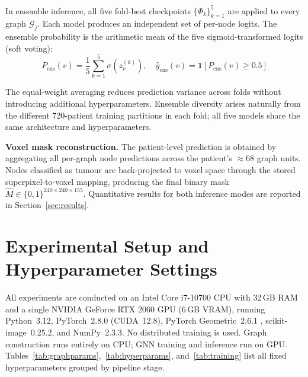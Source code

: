 \documentclass{article}
\begin{document}
In ensemble inference, all five fold-best checkpoints $\{\Phi_k\}_{k=1}^{5}$ are
applied to every graph $\mathcal{G}_j$. Each model produces an independent set of
per-node logits. The ensemble probability is the arithmetic mean of the five
sigmoid-transformed logits (soft voting):
\begin{equation}
    P_{\mathrm{ens}}(v) = \frac{1}{5}\sum_{k=1}^{5}
    \sigma\!\left(z_v^{(k)}\right),
    \quad
    \hat{y}_{\mathrm{ens}}(v) = \mathbf{1}\!\left[P_{\mathrm{ens}}(v) \geq 0.5\right]
    \label{eq:ensemble}
\end{equation}

The equal-weight averaging reduces prediction variance across folds without
introducing additional hyperparameters. Ensemble diversity arises naturally from
the different 720-patient training partitions in each fold; all five models share
the same architecture and hyperparameters.

\textbf{Voxel mask reconstruction.}
The patient-level prediction is obtained by aggregating all per-graph node
predictions across the patient's $\approx$68 graph units. Nodes classified as
tumour are back-projected to voxel space through the stored superpixel-to-voxel
mapping, producing the final binary mask
$\hat{M} \in \{0,1\}^{240 \times 240 \times 155}$. Quantitative results for
both inference modes are reported in Section~\ref{sec:results}.

\section{Experimental Setup and Hyperparameter Settings}
\label{sec:expsetup}

All experiments are conducted on an Intel Core i7-10700 CPU with 32\,GB RAM and a
single NVIDIA GeForce RTX 2060 GPU (6\,GB VRAM), running Python~3.12,
PyTorch~2.8.0 (CUDA~12.8), PyTorch Geometric~2.6.1 \cite{fey2019pyg},
scikit-image~0.25.2, and NumPy~2.3.3. No distributed training is used.
Graph construction runs entirely on CPU; GNN training and inference run on GPU.
Tables~\ref{tab:graphparams},~\ref{tab:hyperparams},
and~\ref{tab:training} list all fixed hyperparameters grouped by pipeline stage.
\end{document}
